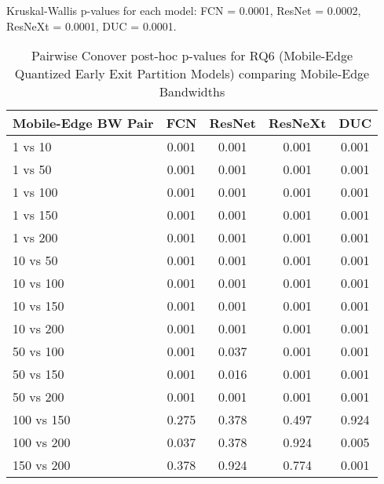 \begin{table}[h]
\centering
\caption{Pairwise Conover post-hoc p-values for RQ6 (Mobile-Edge Quantized Early Exit Partition Models) comparing Mobile-Edge Bandwidths}
\label{tab:conover_mobile_edge_quantized_earlyexit_partition}
\smallskip
Kruskal-Wallis p-values for each model: FCN = 0.0001, ResNet = 0.0002, ResNeXt = 0.0001, DUC = 0.0001.

\begin{tabular}{lcccc}
\toprule
Mobile-Edge BW Pair & FCN & ResNet & ResNeXt & DUC \\
\midrule
1 vs 10 & 0.001 & 0.001 & 0.001 & 0.001 \\
1 vs 50 & 0.001 & 0.001 & 0.001 & 0.001 \\
1 vs 100 & 0.001 & 0.001 & 0.001 & 0.001 \\
1 vs 150 & 0.001 & 0.001 & 0.001 & 0.001 \\
1 vs 200 & 0.001 & 0.001 & 0.001 & 0.001 \\
10 vs 50 & 0.001 & 0.001 & 0.001 & 0.001 \\
10 vs 100 & 0.001 & 0.001 & 0.001 & 0.001 \\
10 vs 150 & 0.001 & 0.001 & 0.001 & 0.001 \\
10 vs 200 & 0.001 & 0.001 & 0.001 & 0.001 \\
50 vs 100 & 0.001 & 0.037 & 0.001 & 0.001 \\
50 vs 150 & 0.001 & 0.016 & 0.001 & 0.001 \\
50 vs 200 & 0.001 & 0.001 & 0.001 & 0.001 \\
100 vs 150 & 0.275 & 0.378 & 0.497 & 0.924 \\
100 vs 200 & 0.037 & 0.378 & 0.924 & 0.005 \\
150 vs 200 & 0.378 & 0.924 & 0.774 & 0.001 \\
\bottomrule
\end{tabular}
\end{table}
